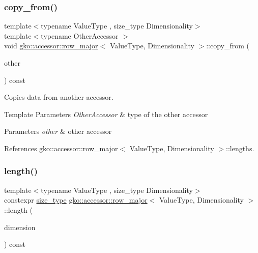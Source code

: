 \subsubsection{\texorpdfstring{copy\+\_\+from()}{copy\_from()}}
{\footnotesize\ttfamily template$<$typename Value\+Type , size\+\_\+type Dimensionality$>$ \\
template$<$typename Other\+Accessor $>$ \\
void \hyperlink{classgko_1_1accessor_1_1row__major}{gko\+::accessor\+::row\+\_\+major}$<$ Value\+Type, Dimensionality $>$\+::copy\+\_\+from (\begin{DoxyParamCaption}\item[{const Other\+Accessor \&}]{other }\end{DoxyParamCaption}) const\hspace{0.3cm}{\ttfamily [inline]}}



Copies data from another accessor. 


\begin{DoxyTemplParams}{Template Parameters}
{\em Other\+Accessor} & type of the other accessor\\
\hline
\end{DoxyTemplParams}

\begin{DoxyParams}{Parameters}
{\em other} & other accessor \\
\hline
\end{DoxyParams}


References gko\+::accessor\+::row\+\_\+major$<$ Value\+Type, Dimensionality $>$\+::lengths.

\mbox{\label{classgko_1_1accessor_1_1row__major_a438bb22bf86a33db403119bcb914dacc}} 
\subsubsection{\texorpdfstring{length()}{length()}}
{\footnotesize\ttfamily template$<$typename Value\+Type , size\+\_\+type Dimensionality$>$ \\
constexpr \hyperlink{namespacegko_a6e5c95df0ae4e47aab2f604a22d98ee7}{size\+\_\+type} \hyperlink{classgko_1_1accessor_1_1row__major}{gko\+::accessor\+::row\+\_\+major}$<$ Value\+Type, Dimensionality $>$\+::length (\begin{DoxyParamCaption}\item[{\hyperlink{namespacegko_a6e5c95df0ae4e47aab2f604a22d98ee7}{size\+\_\+type}}]{dimension }\end{DoxyParamCaption}) const\hspace{0.3cm}{\ttfamily [inline]}}



